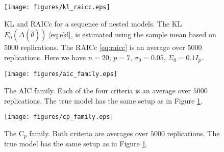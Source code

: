 \documentclass[11pt]{article}
\begin{document}
{\begin{figure}[!ht]
  \centering
  \texttt{[image: figures/kl\_raicc.eps]}
  \caption{KL and RAICc for a sequence of nested models. The KL $E_0(\Delta(\hat{\theta}))$ \eqref{eq:ekl}, is estimated using the sample mean based on $5000$ replications. The RAICc \eqref{eq:raicc} is an average over $5000$ replications. Here we have $n=20$, $p=7$, $\sigma_0=0.05$, $\Sigma_0=0.1 I_p$.}
  \label{fig:kl_raicc}
\end{figure}

\begin{figure}[!ht]
  \centering
  \texttt{[image: figures/aic\_family.eps]}
  \caption{The AIC family. Each of the four criteria is an average over $5000$ replications. The true model has the same setup as in Figure \ref{fig:kl_raicc}.}
  \label{fig:aic_family}
\end{figure}

\begin{figure}[!ht]
  \centering
  \texttt{[image: figures/cp\_family.eps]}
  \caption{The C$_p$ family. Both criteria are averages over $5000$ replications. The true model has the same setup as in Figure \ref{fig:kl_raicc}.}
  \label{fig:cp_family}
\end{figure}
\clearpage

}
\end{document}
